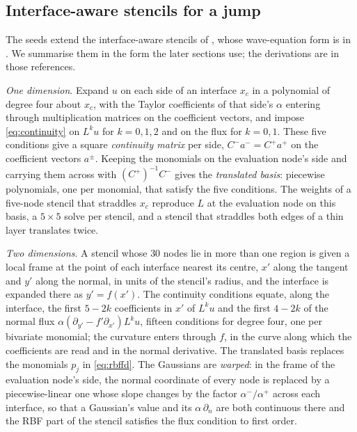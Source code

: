 \documentclass[11pt]{amsart}
\theoremstyle{definition}
\theoremstyle{remark}
\newcommand{\para}[1]{\par\smallskip\noindent\textit{#1}.\enspace}
\begin{document}
\subsection{Interface-aware stencils for a jump}
\label{sec:jump}
The seeds extend the interface-aware stencils of
\cite{Martin2016,MartinFornberg2017heat}, whose wave-equation form is in
\cite{MartinFornbergStCyr2015,MartinFornberg2017}. We summarise them in
the form the later sections use; the derivations are in those references.

\para{One dimension}
Expand $u$ on each side of an interface $x_c$ in a polynomial of degree
four about $x_c$, with the Taylor coefficients of that side's $\alpha$
entering through multiplication matrices on the coefficient vectors, and
impose \eqref{eq:continuity} on $L^k u$ for $k = 0, 1, 2$ and on the flux
for $k = 0, 1$. These five conditions give a square \emph{continuity
matrix} per side, $C^- a^- = C^+ a^+$ on the coefficient vectors $a^\pm$.
Keeping the monomials on the evaluation node's side and carrying them
across with $(C^+)^{-1} C^-$ gives the \emph{translated basis}: piecewise
polynomials, one per monomial, that satisfy the five conditions. The weights
of a five-node stencil that straddles $x_c$ reproduce $L$ at the evaluation
node on this basis, a $5 \times 5$ solve per stencil, and a stencil that
straddles both edges of a thin layer translates twice.

\para{Two dimensions}
A stencil whose $30$ nodes lie in more than one region is given a local
frame at the point of each interface nearest its centre, $x'$ along the
tangent and $y'$ along the normal, in units of the stencil's radius, and
the interface is expanded there as $y' = f(x')$. The continuity conditions
equate, along the interface, the first $5 - 2k$ coefficients in $x'$ of
$L^k u$ and the first $4 - 2k$ of the normal flux
$\alpha (\partial_{y'} - f' \partial_{x'}) L^k u$, fifteen conditions for
degree four, one per bivariate monomial; the curvature enters through $f$,
in the curve along which the coefficients are read and in the normal
derivative. The translated basis replaces the monomials $p_j$ in
\eqref{eq:rbffd}. The Gaussians are \emph{warped}: in the frame of the
evaluation node's side, the normal coordinate of every node is replaced by
a piecewise-linear one whose slope changes by the factor $\alpha^- /
\alpha^+$ across each interface, so that a Gaussian's value and its
$\alpha\, \partial_n$ are both continuous there and the RBF part of the
stencil satisfies the flux condition to first order.
\end{document}
